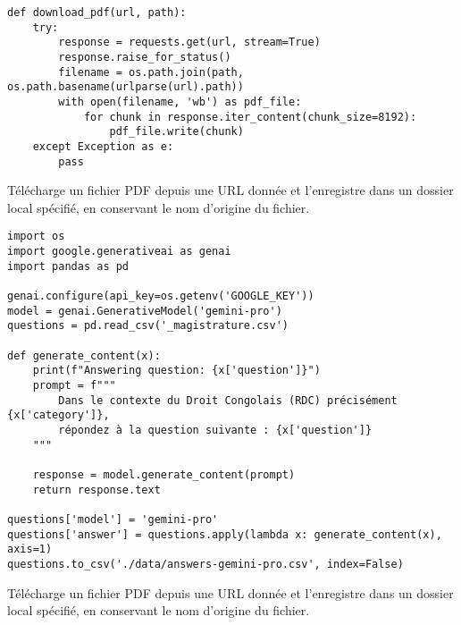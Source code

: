 \begin{listing}[!ht]
\begin{verbatim}
def download_pdf(url, path):
    try:
        response = requests.get(url, stream=True)
        response.raise_for_status()
        filename = os.path.join(path, os.path.basename(urlparse(url).path))
        with open(filename, 'wb') as pdf_file:
            for chunk in response.iter_content(chunk_size=8192):
                pdf_file.write(chunk)
    except Exception as e:
        pass
\end{verbatim}
\caption{Télécharge un fichier PDF depuis une URL donnée et l'enregistre dans un dossier local spécifié, en conservant le nom d'origine du fichier.}
\label{appendix:code:python:pdf-download}
\end{listing}

\begin{listing}[!ht]
\begin{verbatim}
import os
import google.generativeai as genai
import pandas as pd

genai.configure(api_key=os.getenv('GOOGLE_KEY'))
model = genai.GenerativeModel('gemini-pro')
questions = pd.read_csv('_magistrature.csv')

def generate_content(x):
    print(f"Answering question: {x['question']}")
    prompt = f"""
        Dans le contexte du Droit Congolais (RDC) précisément {x['category']},
        répondez à la question suivante : {x['question']}
    """

    response = model.generate_content(prompt)
    return response.text

questions['model'] = 'gemini-pro'
questions['answer'] = questions.apply(lambda x: generate_content(x), axis=1)
questions.to_csv('./data/answers-gemini-pro.csv', index=False)
\end{verbatim}
\caption{Télécharge un fichier PDF depuis une URL donnée et l'enregistre dans un dossier local spécifié, en conservant le nom d'origine du fichier.}
\label{appendix:code:python:gemini-pro-evaluation}
\end{listing}

